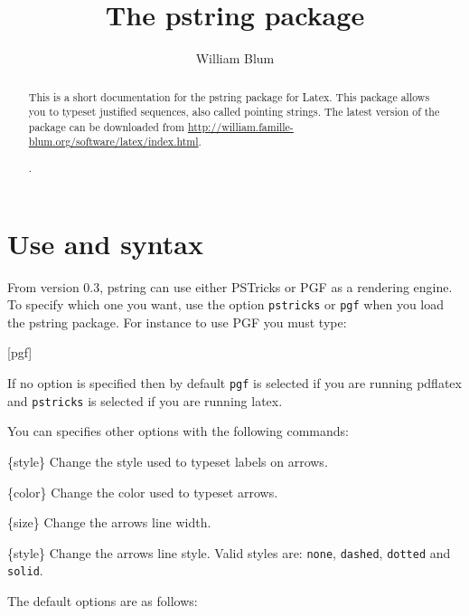 
%

\author{William Blum}
\title{The pstring package}

\maketitle
\begin{abstract}
This is a short documentation for the pstring package for Latex. This package allows you to
typeset justified sequences, also called pointing strings.
The latest version of the package can be downloaded from \url{http://william.famille-blum.org/software/latex/index.html}.

\begin{codeexample}[width=5cm]
.
\end{codeexample}
\end{abstract}

\section{Use and syntax}

From version 0.3, pstring can use either PSTricks or PGF as a rendering engine. To specify which one
you want, use the option \verb|pstricks| or \verb|pgf| when you load the pstring package. For instance to use PGF you must type:
\begin{codeexample}
\usepackage{pstring}[pgf]
\end{codeexample}
If no option is specified then by default \verb|pgf| is selected if you are running pdflatex
and \verb|pstricks| is selected if you are running latex.

You can specifies other options with the following commands:
\begin{command}{\pstrSetLabelStyle\{style\}}
Change the style used to typeset labels on arrows.
\end{command}
\begin{command}{\pstrSetArrowColor\{color\}}
Change the color used to typeset arrows.
\end{command}
\begin{command}{\pstrSetArrowLineWidth\{size\}}
Change the arrows line width.
\end{command}
\begin{command}{\pstrSetArrowLineStyle\{style\}}
Change the arrows line style. Valid styles are: \verb|none|, \verb|dashed|, \verb|dotted| and \verb|solid|.
\end{command}
The default options are as follows:
\begin{codeexample}
\pstrSetLabelStyle{\color{blue} \tiny}
\pstrSetArrowLineWidth{0.3pt}
\end{codeexample}

